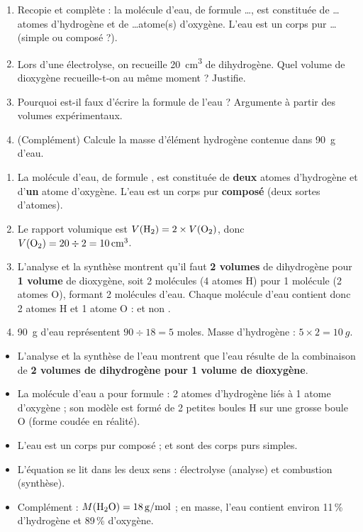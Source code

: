 \documentclass[11pt]{article}
\newcommand{\cle}[1]{{\popxbold\color{popdark}#1}}
\begin{document}
\begin{exercice}
\begin{enumerate}
\item Recopie et complète : la molécule d'eau, de formule \ldots, est constituée de \ldots atomes d'hydrogène et de \ldots atome(s) d'oxygène. L'eau est un corps pur \ldots (simple ou composé ?).
\item Lors d'une électrolyse, on recueille \SI{20}{cm^3} de dihydrogène. Quel volume de dioxygène recueille-t-on au même moment ? Justifie.
\item Pourquoi est-il faux d'écrire la formule de l'eau  ? Argumente à partir des volumes expérimentaux.
\item (Complément) Calcule la masse d'élément hydrogène contenue dans \SI{90}{g} d'eau.
\end{enumerate}
\end{exercice}

\begin{corrige}
\begin{enumerate}
\item La molécule d'eau, de formule , est constituée de \textbf{deux} atomes d'hydrogène et d'\textbf{un} atome d'oxygène. L'eau est un corps pur \textbf{composé} (deux sortes d'atomes).
\item Le rapport volumique est $V(\ce{H2}) = 2 \times V(\ce{O2})$, donc $V(\ce{O2}) = 20 \div 2 = \SI{10}{cm^3}$.
\item L'analyse et la synthèse montrent qu'il faut \textbf{2 volumes} de dihydrogène pour \textbf{1 volume} de dioxygène, soit 2 molécules  (4 atomes H) pour 1 molécule  (2 atomes O), formant 2 molécules d'eau. Chaque molécule d'eau contient donc 2 atomes H et 1 atome O :  et non .
\item \SI{90}{g} d'eau représentent $90 \div 18 = 5$ moles. Masse d'hydrogène : $5 \times 2 = \SI{10}{g}$.
\end{enumerate}
\end{corrige}

\begin{aretenir}
\begin{itemize}
\item L'analyse et la synthèse de l'eau montrent que l'eau résulte de la combinaison de \textbf{2 volumes de dihydrogène pour 1 volume de dioxygène}.
\item La molécule d'eau a pour formule \cle{} : 2 atomes d'hydrogène liés à 1 atome d'oxygène ; son modèle est formé de 2 petites boules H sur une grosse boule O (forme coudée en réalité).
\item L'eau est un \cle{corps pur composé} ;  et  sont des \cle{corps purs simples}.
\item L'équation  se lit dans les deux sens : électrolyse (analyse) et combustion (synthèse).
\item Complément : $M(\ce{H2O}) = \SI{18}{g/mol}$ ; en masse, l'eau contient environ 11\,\% d'hydrogène et 89\,\% d'oxygène.
\end{itemize}
\end{aretenir}
\end{document}
